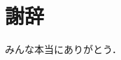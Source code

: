 \documentclass[../main/main]{subfiles}
\begin{document}
\chapter*{謝辞}
みんな本当にありがとう．

\vspace{5mm}
\par
{}
\end{document}
